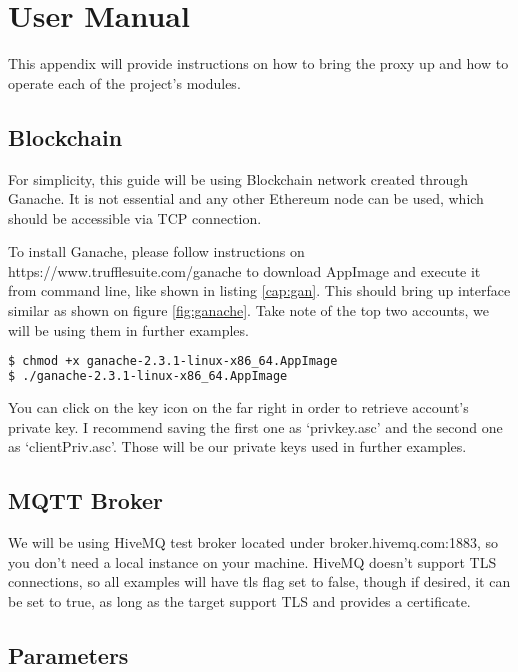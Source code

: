 \chapter{User Manual}
This appendix will provide instructions on how to bring the proxy up and how to operate each of the project's modules.
\section{Blockchain}
For simplicity, this guide will be using Blockchain network created through Ganache. It is not essential and any other Ethereum node can be used, which should be accessible via TCP connection.

To install Ganache, please follow instructions on https://www.trufflesuite.com/ganache to download AppImage and execute it from command line, like shown in listing \ref{cap:gan}. This should bring up interface similar as shown on figure \ref{fig:ganache}. Take note of the top two accounts, we will be using them in further examples.

\begin{lstlisting}[language=bash,breaklines=true,label={cap:gan},caption={Launching Ganache}]
$ chmod +x ganache-2.3.1-linux-x86_64.AppImage
$ ./ganache-2.3.1-linux-x86_64.AppImage
\end{lstlisting}

You can click on the key icon on the far right in order to retrieve account's private key. I recommend saving the first one as `privkey.asc' and the second one as `clientPriv.asc'. Those will be our private keys used in further examples.
\section{MQTT Broker}
We will be using HiveMQ test broker located under broker.hivemq.com:1883, so you don't need a local instance on your machine. HiveMQ doesn't support TLS connections, so all examples will have tls flag set to false, though if desired, it can be set to true, as long as the target support TLS and provides a certificate.
\section{Parameters}
